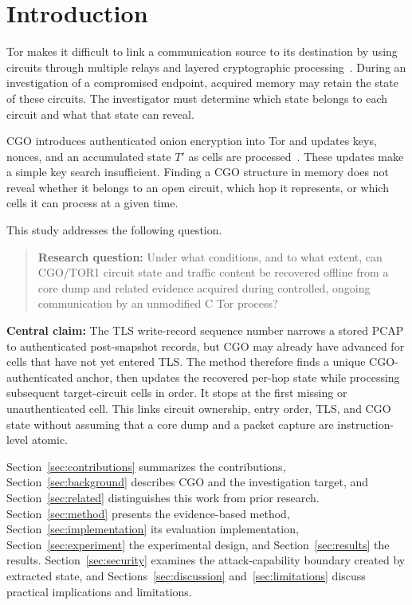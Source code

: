\documentclass[10pt,a4paper]{article}
\newcommand{\torone}{\textsc{TOR1}}
\newcommand{\centralclaim}[1]{%
  \par\noindent\textbf{Central claim: }#1\par
}
\begin{document}
\section{Introduction}

Tor makes it difficult to link a communication source to its destination by using circuits through multiple relays and layered cryptographic processing~\cite{dingledine2004tor}.
During an investigation of a compromised endpoint, acquired memory may retain the state of these circuits. The investigator must determine which state belongs to each circuit and what that state can reveal.

CGO introduces authenticated onion encryption into Tor and updates keys, nonces, and an accumulated state $T'$ as cells are processed~\cite{torproposal359,degabriele2025cgo}.
These updates make a simple key search insufficient. Finding a CGO structure in memory does not reveal whether it belongs to an open circuit, which hop it represents, or which cells it can process at a given time.

This study addresses the following question.

\begin{quote}
\textbf{Research question:} Under what conditions, and to what extent, can CGO/\torone{} circuit state and traffic content be recovered offline from a core dump and related evidence acquired during controlled, ongoing communication by an unmodified C Tor process?
\end{quote}

\centralclaim{The TLS write-record sequence number narrows a stored PCAP to authenticated post-snapshot records, but CGO may already have advanced for cells that have not yet entered TLS. The method therefore finds a unique CGO-authenticated anchor, then updates the recovered per-hop state while processing subsequent target-circuit cells in order. It stops at the first missing or unauthenticated cell. This links circuit ownership, entry order, TLS, and CGO state without assuming that a core dump and a packet capture are instruction-level atomic.}

Section~\ref{sec:contributions} summarizes the contributions, Section~\ref{sec:background} describes CGO and the investigation target, and Section~\ref{sec:related} distinguishes this work from prior research. Section~\ref{sec:method} presents the evidence-based method, Section~\ref{sec:implementation} its evaluation implementation, Section~\ref{sec:experiment} the experimental design, and Section~\ref{sec:results} the results. Section~\ref{sec:security} examines the attack-capability boundary created by extracted state, and Sections~\ref{sec:discussion} and~\ref{sec:limitations} discuss practical implications and limitations.
\end{document}
